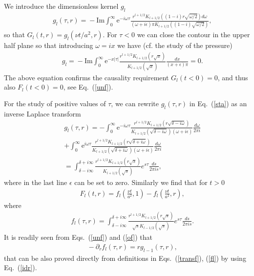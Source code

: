 \documentclass[aps,prx,twocolumn,amsmath,amssymb,amsfonts]{revtex4-2}
\newcommand{\rIm}{\mathrm{Im}}
\newcommand{\re}{\mathrm{e}}            %
\begin{document}
We introduce the dimensionless kernel $g_l$
\begin{eqnarray}&&\!\!\!\!\!\!\!\!\!\!
g_l(\tau, r)\!=\!  -\rIm  \!\!\int_{0}^{\infty}\!\!\!\!\!\re^{-i \omega \tau} \frac{r^{l+1/2} K_{l+1/2}((1\!-\!i)r \sqrt{\omega/2} )d\omega}{(\omega\!+\!i\epsilon) \pi K_{l+1/2}((1\!-\!i) \sqrt{\omega/2})},\label{sta}
\end{eqnarray}
so that $G_l(t, r)= g_l\left(\nu t/a^2, r\right)$. For $\tau<0$ we can close the contour in the upper half plane so that introducing $\omega=ix$ we have (cf. the study of the pressure)
\begin{eqnarray}&&\!\!\!\!\!\!\!
g_l\!=\!-\rIm \int_{0}^{\infty}\!\re^{- x|\tau|} \frac{r^{l+1/2}K_{l+1/2}(r \sqrt{x} )}{K_{l+1/2}(\sqrt{x})}\frac{dx}{(x+\epsilon) \pi}\!=\!0.
\end{eqnarray}
The above equation confirms the causality requirement $G_l(t<0)=0$, and thus also $F_l(t<0)=0$, see Eq.~(\ref{unf}).

For the study of positive values of $\tau$, we can rewrite $g_l(\tau, r)$ in Eq.~(\ref{sta}) as an inverse Laplace transform
\begin{eqnarray}&&
g_l(\tau, r)=-\int_{0}^{\infty}\re^{-i \omega \tau} \frac{r^{l+1/2}K_{l+1/2}(r \sqrt{\delta-i\omega})}{K_{l+1/2}(\sqrt{\delta-i\omega})(\omega\!+\!i\epsilon)}\frac{d\omega}{2\pi i }\nonumber\\&&
+\int_{0}^{\infty}\re^{i \omega \tau} \frac{r^{l+1/2}K_{l+1/2}(r \sqrt{\delta+i\omega})}{K_{l+1/2}(\sqrt{\delta+i\omega})(\omega\!+\!i\epsilon)}\frac{d\omega}{2\pi i}\nonumber\\&&
=\int_{\delta-i\infty}^{\delta+i\infty}\frac{r^{l+1/2}K_{l+1/2}(r \sqrt{s})}{K_{l+1/2}(\sqrt{s})}e^{s\tau}\frac{ds}{2\pi i s},\label{transf}
\end{eqnarray}
where in the last line $\epsilon$ can be set to zero. Similarly we find that for $t>0$
\begin{eqnarray}&&\!\!\!\!\!\!\!
F_l(t, r)=f_l\left(\frac{\nu t}{a^2}, 1\right)-f_l\left(\frac{\nu t}{a^2}, r\right), \label{of}
\end{eqnarray}
where
\begin{eqnarray}&&\!\!\!\!\!\!\!
f_l(\tau, r)\!=\! \int_{\delta-i\infty}^{\delta+i\infty}\frac{r^{l+1/2}K_{l+1/2}(r \sqrt{s})}{\sqrt{s} K_{l-1/2}(\sqrt{s})}e^{s\tau}\frac{ds}{2\pi i s}.\label{fl}
\end{eqnarray}
It is readily seen from Eqs.~(\ref{unf}) and (\ref{of}) that
\begin{eqnarray}&&\!\!\!\!\!\!\!
-\partial_r f_l(\tau, r)\!=\! rg_{l-1}(\tau, r), \label{recur}
\end{eqnarray}
that can be also proved directly from definitions in Eqs.~(\ref{transf}), (\ref{fl}) by using Eq.~(\ref{idr}).
\end{document}
